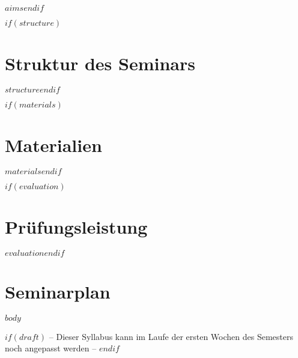 \documentclass[11pt,a4paper]{article}
\begin{document}
$aims$$endif$

$if(structure)$\section*{Struktur des Seminars}

$structure$$endif$

$if(materials)$\section*{Materialien}

$materials$$endif$

$if(evaluation)$\section*{Prüfungsleistung}

$evaluation$$endif$


\section*{Seminarplan}

$body$

$if(draft)$
\centering
	-- Dieser Syllabus kann im Laufe der ersten Wochen des Semesters noch angepasst werden --
$endif$
\end{document}
